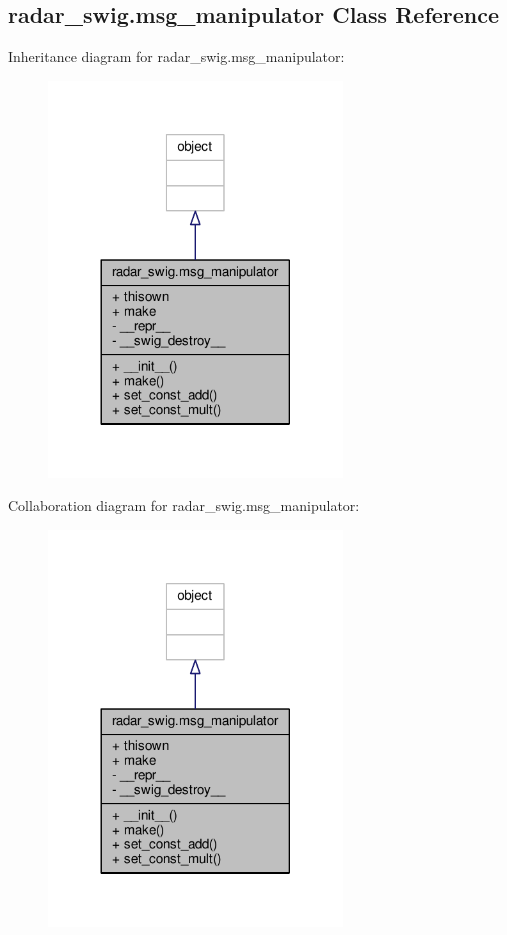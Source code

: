 \subsection{radar\+\_\+swig.\+msg\+\_\+manipulator Class Reference}
\label{classradar__swig_1_1msg__manipulator}


Inheritance diagram for radar\+\_\+swig.\+msg\+\_\+manipulator\+:
\nopagebreak
\begin{figure}[H]
\begin{center}
\leavevmode
\includegraphics[width=221pt]{db/d37/classradar__swig_1_1msg__manipulator__inherit__graph}
\end{center}
\end{figure}


Collaboration diagram for radar\+\_\+swig.\+msg\+\_\+manipulator\+:
\nopagebreak
\begin{figure}[H]
\begin{center}
\leavevmode
\includegraphics[width=221pt]{d0/d2a/classradar__swig_1_1msg__manipulator__coll__graph}
\end{center}
\end{figure}
